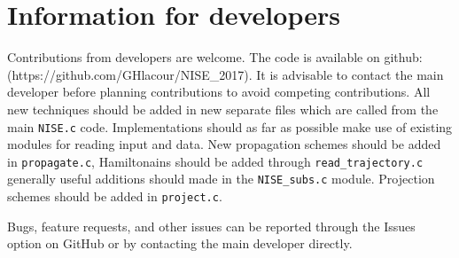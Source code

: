 \chapter{Information for developers\label{chap:developers}}
Contributions from developers are welcome. The code is available on
github:\\ (https://github.com/GHlacour/NISE\_2017). It is advisable to contact the main developer before planning contributions to avoid competing contributions. All new techniques should be added in new separate files which are called from the main {\tt NISE.c} code. 
Implementations should as far as possible make use of existing modules for reading input and data. New propagation schemes should be added in {\tt propagate.c}, Hamiltonains should be added through {\tt read\_trajectory.c} generally useful additions should made in the {\tt NISE\_subs.c} module. Projection schemes should be added in {\tt project.c}.

Bugs, feature requests, and other issues can be reported through the Issues option on GitHub or by contacting the main developer directly.
